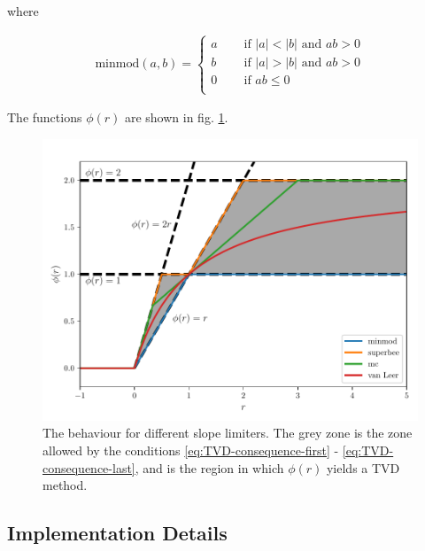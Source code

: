where

\begin{align}
	\mathrm{minmod}(a, b) = 
		\begin{cases}
			a	& \quad \text{ if } |a| < |b| \text{ and } ab > 0\\
			b	& \quad \text{ if } |a| > |b| \text{ and } ab > 0\\
			0	& \quad \text{ if } ab \leq 0\\
		\end{cases}		
\end{align}



The functions $\phi(r)$ are shown in fig. \ref{fig:limiters-r-phi}.



\begin{figure}[H]
	\centering
	\includegraphics[width=.9\textwidth]{./figures/limiters.pdf}%
	\caption{
		\label{fig:limiters-r-phi}
		The behaviour for different slope limiters. 
		The grey zone is the zone allowed by the conditions \ref{eq:TVD-consequence-first}  - \ref{eq:TVD-consequence-last}, and is the region in which $\phi(r)$ yields a TVD method.
	}
\end{figure}





\subsection{Implementation Details}



